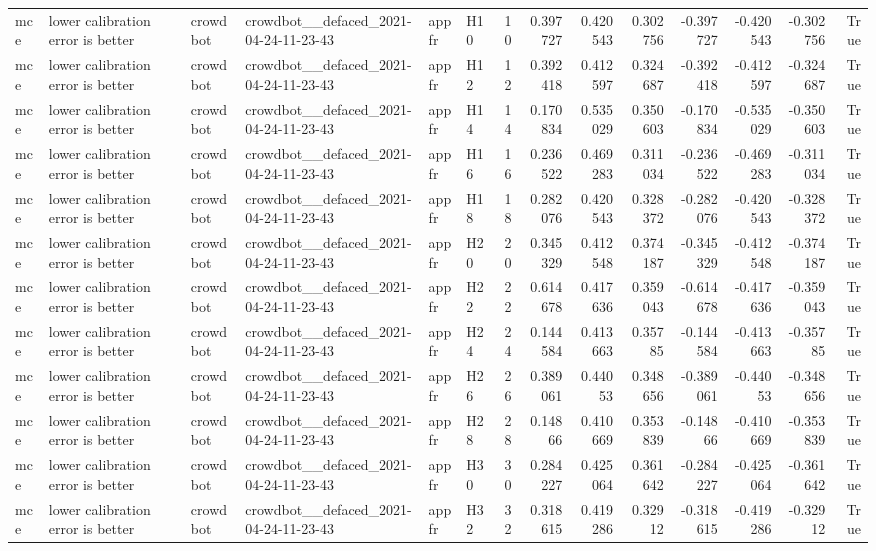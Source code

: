 \begin{longtable}{llllllrrrrrrrr}
mce & lower calibration error is better & crowdbot & crowdbot\_\_defaced\_2021-04-24-11-23-43 & appfr & H10 & 10 & 0.397727 & 0.420543 & 0.302756 & -0.397727 & -0.420543 & -0.302756 & True \\
mce & lower calibration error is better & crowdbot & crowdbot\_\_defaced\_2021-04-24-11-23-43 & appfr & H12 & 12 & 0.392418 & 0.412597 & 0.324687 & -0.392418 & -0.412597 & -0.324687 & True \\
mce & lower calibration error is better & crowdbot & crowdbot\_\_defaced\_2021-04-24-11-23-43 & appfr & H14 & 14 & 0.170834 & 0.535029 & 0.350603 & -0.170834 & -0.535029 & -0.350603 & True \\
mce & lower calibration error is better & crowdbot & crowdbot\_\_defaced\_2021-04-24-11-23-43 & appfr & H16 & 16 & 0.236522 & 0.469283 & 0.311034 & -0.236522 & -0.469283 & -0.311034 & True \\
mce & lower calibration error is better & crowdbot & crowdbot\_\_defaced\_2021-04-24-11-23-43 & appfr & H18 & 18 & 0.282076 & 0.420543 & 0.328372 & -0.282076 & -0.420543 & -0.328372 & True \\
mce & lower calibration error is better & crowdbot & crowdbot\_\_defaced\_2021-04-24-11-23-43 & appfr & H20 & 20 & 0.345329 & 0.412548 & 0.374187 & -0.345329 & -0.412548 & -0.374187 & True \\
mce & lower calibration error is better & crowdbot & crowdbot\_\_defaced\_2021-04-24-11-23-43 & appfr & H22 & 22 & 0.614678 & 0.417636 & 0.359043 & -0.614678 & -0.417636 & -0.359043 & True \\
mce & lower calibration error is better & crowdbot & crowdbot\_\_defaced\_2021-04-24-11-23-43 & appfr & H24 & 24 & 0.144584 & 0.413663 & 0.35785 & -0.144584 & -0.413663 & -0.35785 & True \\
mce & lower calibration error is better & crowdbot & crowdbot\_\_defaced\_2021-04-24-11-23-43 & appfr & H26 & 26 & 0.389061 & 0.44053 & 0.348656 & -0.389061 & -0.44053 & -0.348656 & True \\
mce & lower calibration error is better & crowdbot & crowdbot\_\_defaced\_2021-04-24-11-23-43 & appfr & H28 & 28 & 0.14866 & 0.410669 & 0.353839 & -0.14866 & -0.410669 & -0.353839 & True \\
mce & lower calibration error is better & crowdbot & crowdbot\_\_defaced\_2021-04-24-11-23-43 & appfr & H30 & 30 & 0.284227 & 0.425064 & 0.361642 & -0.284227 & -0.425064 & -0.361642 & True \\
mce & lower calibration error is better & crowdbot & crowdbot\_\_defaced\_2021-04-24-11-23-43 & appfr & H32 & 32 & 0.318615 & 0.419286 & 0.32912 & -0.318615 & -0.419286 & -0.32912 & True \\

\end{longtable}
